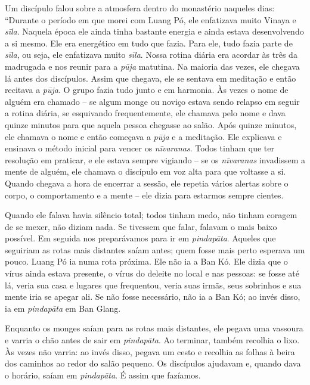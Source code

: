 Um discípulo falou sobre a atmosfera dentro do monastério naqueles dias:
``Durante o período em que morei com Luang Pó, ele enfatizava muito
Vinaya e \emph{sīla}. Naquela época ele ainda tinha bastante energia e
ainda estava desenvolvendo a si mesmo. Ele era energético em tudo que
fazia. Para ele, tudo fazia parte de \emph{sīla}, ou seja, ele
enfatizava muito \emph{sīla}. Nossa rotina diária era acordar às três da madrugada e nos reunir para a
\emph{pūja} matutina. Na maioria das vezes, ele chegava lá antes dos
discípulos. Assim que chegava, ele se sentava em meditação e então
recitava a \emph{pūja}. O grupo fazia tudo junto e em harmonia. Às vezes
o nome de alguém era chamado -- se algum monge ou noviço estava sendo
relapso em seguir a rotina diária, se esquivando frequentemente, ele
chamava pelo nome e dava quinze minutos para que aquela pessoa chegasse
ao salão. Após quinze minutos, ele chamava o nome e então começava a
\emph{pūja} e a meditação. Ele explicava e ensinava o método inicial
para vencer os \emph{nīvaranas}. Todos tinham que ter resolução em
praticar, e ele estava sempre vigiando -- se os \emph{nīvaranas}
invadissem a mente de alguém, ele chamava o discípulo em voz alta para
que voltasse a si. Quando chegava a hora de encerrar a sessão, ele
repetia vários alertas sobre o corpo, o comportamento e a mente -- ele
dizia para estarmos sempre cientes.

Quando ele falava havia silêncio total; todos tinham medo, não tinham
coragem de se mexer, não diziam nada. Se tivessem que falar, falavam o
mais baixo possível. Em seguida nos preparávamos para ir em
\emph{pindapāta}. Aqueles que seguiriam as rotas mais distantes saíam
antes; quem fosse mais perto esperava um pouco. Luang Pó ia numa rota
próxima. Ele não ia a Ban Kó. Ele dizia que o vírus ainda estava
presente, o vírus do deleite no local e nas pessoas: se fosse até lá,
veria sua casa e lugares que frequentou, veria suas irmãs, seus
sobrinhos e sua mente iria se apegar ali. Se não fosse necessário, não
ia a Ban Kó; ao invés disso, ia em \emph{pindapāta} em Ban Glang.

Enquanto os monges saíam para as rotas mais distantes, ele pegava uma
vassoura e varria o chão antes de sair em \emph{pindapāta}. Ao terminar,
também recolhia o lixo. Às vezes não varria: ao invés disso, pegava um
cesto e recolhia as folhas à beira dos caminhos ao redor do salão
pequeno. Os discípulos ajudavam e, quando dava o horário, saíam em
\emph{pindapāta}. É assim que fazíamos.

